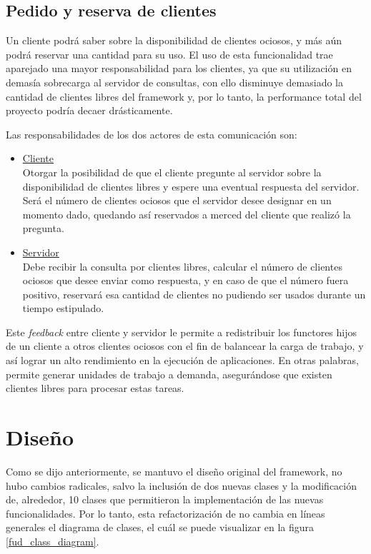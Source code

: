 \subsection{Pedido y reserva de clientes}

Un cliente podrá saber sobre la disponibilidad de clientes ociosos, y más aún podrá reservar una cantidad para su uso. El uso de esta
funcionalidad trae aparejado una mayor responsabilidad para los clientes, ya que su utilización en demasía sobrecarga al servidor de
consultas, con ello disminuye demasiado la cantidad de clientes libres del framework y, por lo tanto, la performance total del proyecto
podría decaer drásticamente.

Las responsabilidades de los dos actores de esta comunicación son:
\begin{itemize}
    \item   \underline{Cliente}\\Otorgar la posibilidad de que el cliente pregunte al servidor sobre la disponibilidad de clientes libres
            y espere una eventual respuesta del servidor. Será el número de clientes ociosos que el servidor desee designar en un momento
            dado, quedando así reservados a merced del cliente que realizó la pregunta.
    \item   \underline{Servidor}\\Debe recibir la consulta por clientes libres, calcular el número de clientes ociosos que desee enviar
            como respuesta, y en caso de que el número fuera positivo, reservará esa cantidad de clientes no pudiendo ser usados durante
            un tiempo estipulado.
\end{itemize}

Este \textit{feedback} entre cliente y servidor le permite a \rc{} redistribuir los functores hijos de un cliente a otros clientes ociosos
con el fin de balancear la carga de trabajo, y así lograr un alto rendimiento en la ejecución de aplicaciones. En otras palabras, permite
generar unidades de trabajo a demanda, asegurándose que existen clientes libres para procesar estas tareas.

 
\section{Diseño}
\label{redesign_design}

Como se dijo anteriormente, se mantuvo el diseño original del framework, no hubo cambios radicales, salvo la inclusión de dos nuevas clases
y la modificación de, alrededor, 10 clases que permitieron la implementación de las nuevas funcionalidades. Por lo tanto, esta
refactorización de \fud{} no cambia en líneas generales el diagrama de clases, el cuál se puede visualizar en la figura
\ref{fud_class_diagram}.


